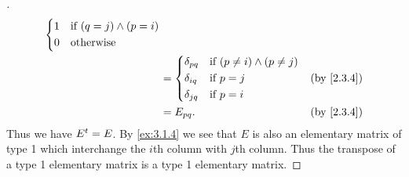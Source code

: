 \begin{proof}[]
\begin{align*}
\begin{dcases}
                                                                1 & \text{if } (q = j) \land (p = i)                     \\
                                                                0 & \text{otherwise}
                                                              \end{dcases}                                \\
                                                          & = \begin{dcases}
                                                                \delta_{p q} & \text{if } (p \neq i) \land (p \neq j) \\
                                                                \delta_{i q} & \text{if } p = j                       \\
                                                                \delta_{j q} & \text{if } p = i
                                                              \end{dcases}    &  & \text{(by \cref{2.3.4})}                                   \\
                                                          & = E_{p q}.                                                  &  & \text{(by \cref{2.3.4})}
  \end{align*}
  Thus we have \({E}^{t} = E\).
  By \cref{ex:3.1.4} we see that \(E\) is also an elementary matrix of type 1 which interchange the \(i\)th column with \(j\)th column.
  Thus the transpose of a type 1 elementary matrix is a type 1 elementary matrix.


\end{proof}
